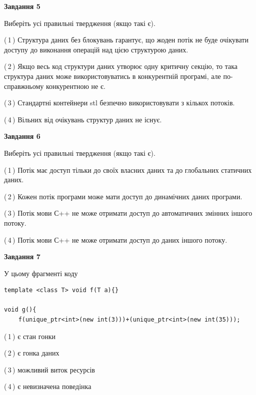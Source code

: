 \documentclass[12pt, ukrainian]{article}
\begin{document}
\begin {large}
{\begin{center}
\textbf{Завдання 5}
\end{center}

Виберіть усі правильні твердження (якщо такі є).\par
\vspace{2mm}

(\,1\,) Структура даних без блокувань гарантує, що жоден потік не буде очікувати доступу до виконання операцій над цією структурою даних.%

(\,2\,) Якщо весь код структури даних утворює одну критичну секцію, то така структура даних може використовуватись в конкурентній програмі, але по-справжньо\-му конкурентною не є.%

(\,3\,) Стандартні контейнери stl безпечно використовувати з кількох потоків.%

(\,4\,) Вільних від очікувань структур даних не існує.%
\newpage


\begin{center}
\textbf{Завдання 6}
\end{center}

Виберіть усі правильні твердження (якщо такі є).\par
\vspace{2mm}

(\,1\,) Потік має доступ тільки до своїх власних даних та до глобальних статичних даних.%

(\,2\,) Кожен потік програми може мати доступ до динамічних даних програми.%

(\,3\,) Потік мови С++ не може отримати доступ до автоматичних змінних іншого потоку.%

(\,4\,) Потік мови С++ не може отримати доступ до даних іншого потоку.%


\begin{center}
\textbf{Завдання 7}
\end{center}

У цьому фрагменті коду
\begin{verbatim}
template <class T> void f(T a){}

void g(){
    f(unique_ptr<int>(new int(3)))+(unique_ptr<int>(new int(35)));
\end{verbatim}

(\,1\,) є стан гонки%

(\,2\,) є гонка даних%

(\,3\,) можливий виток ресурсів%

(\,4\,) є невизначена поведінка%

}
\end {large}

\vspace{4mm}
\newpage
\end{document}
